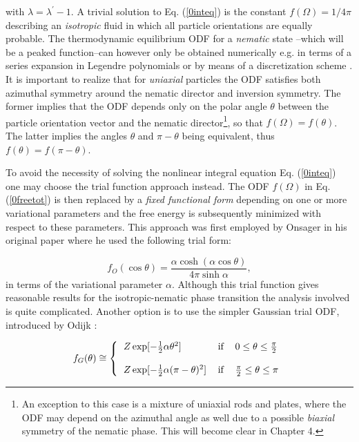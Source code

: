 {with $\lambda=\lambda^{\prime}-1$. A trivial solution to Eq. (\ref{0inteq}) is the constant $f(\Omega)=1/4\pi$ describing an {\em isotropic} fluid in which all particle orientations are equally probable. The thermodynamic equilibrium ODF for a {\em nematic} state --which will be a peaked function--can however only be obtained numerically e.g. in terms of a series expansion in Legendre polynomials \cite{kayser,lasher,lakatos} or by means of a discretization scheme \cite{herzfeldgrid}. It is important to realize that for  {\em uniaxial} particles the ODF satisfies both azimuthal symmetry around the nematic director and inversion symmetry. The former implies that the ODF depends only on the  polar angle $\theta$ between the particle orientation vector and the nematic director\footnote{An exception to this case is a mixture of uniaxial rods and plates,
where the ODF may depend on the azimuthal angle as well
due to a possible {\em biaxial} symmetry of the nematic phase.
This will become clear in Chapter 4.}, so that $f(\Omega)=f(\theta)$. The latter  implies the angles $\theta$ and $\pi-\theta$ being equivalent, thus $f(\theta)=f(\pi-\theta)$.

To avoid the necessity of solving the nonlinear integral equation Eq. (\ref{0inteq}) one may choose the trial function approach instead. The ODF $f(\Omega)$ in Eq. (\ref{0freetot}) is then replaced by a {\em fixed functional form} depending on one or more variational parameters and the free energy is subsequently minimized with respect to these parameters. This approach was first employed by Onsager  in his original paper \cite{onsager1949} where he used the following trial form:

\begin{equation}
f_{O}(\cos \theta) =\frac{\alpha \cosh (\alpha \cos\theta)}{4\pi\sinh \alpha},
\end{equation}
in terms of the variational parameter $\alpha$. Although this trial function gives reasonable results for the isotropic-nematic phase transition the analysis involved is
quite complicated. Another option is to use the simpler Gaussian trial ODF, introduced by Odijk \cite{OdijkLekkerkerker}:

\begin{equation}
f_{G}(\theta ) \cong   \left\{
\begin{tabular}{lll}
$Z\exp [-\frac{1}{2}\alpha\theta ^{2}]$ & if & $%
0\leq \theta \leq \frac{\pi }{2}$ \\
&  &  \\
$Z\exp [-\frac{1}{2}\alpha (\pi -\theta )^{2}]$
& if & $\frac{\pi}{2}\leq \theta \leq \pi $%
\end{tabular}
\right.  \label{0ODF}
\end{equation}

}
